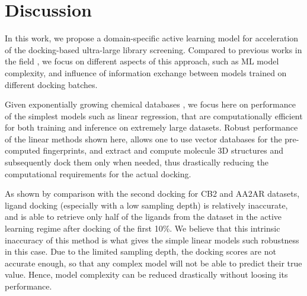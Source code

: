 \section{Discussion}

In this work, we propose a domain-specific active learning model for acceleration of the docking-based ultra-large library screening. Compared to previous works in the field \cite{deepdocking, logistic_regression, Yang2021_shoichet_active_learning, Graff2021AcceleratingLearning}, we focus on different aspects of this approach, such as ML model complexity, and influence of information exchange between models trained on different docking batches.

Given exponentially growing chemical databases \cite{warr_exploration_2022, lyu_modeling_2023}, we focus here on performance of the simplest models such as linear regression, that are computationally efficient for both training and inference on extremely large datasets. Robust performance of the linear methods shown here, allows one to use vector databases \cite{noauthor_vector_nodate, noauthor_qdrant_nodate, johnson2019_faiss_vector_database} for the pre-computed fingerprints, and extract and compute molecule 3D structures and subsequently dock them only when needed, thus drastically reducing the computational requirements for the actual docking.

As shown by comparison with the second docking for CB2 and AA2AR datasets, ligand docking (especially with a low sampling depth) is relatively inaccurate, and is able to retrieve only half of the ligands from the dataset in the active learning regime after docking of the first 10\%. We believe that this intrinsic inaccuracy of this method is what gives the simple linear models such robustness in this case. Due to the limited sampling depth, the docking scores are not accurate enough, so that any complex model will not be able to predict their true value. Hence, model complexity can be reduced drastically without loosing its performance.


